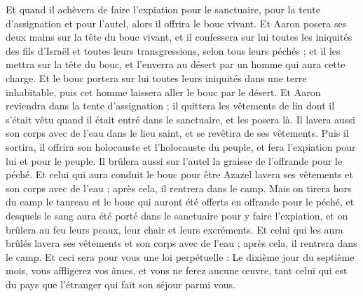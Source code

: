 \begin{multicols}{2}
Et quand il achèvera de faire l’expiation pour le sanctuaire, pour la tente d'assignation et pour l'autel, alors il offrira le bouc vivant.
Et Aaron posera ses deux mains sur la tête du bouc vivant, et il confessera sur lui toutes les iniquités des fils d'Israël et toutes leurs transgressions, selon tous leurs péchés ; et il les mettra sur la tête du bouc, et l'enverra au désert par un homme qui aura cette charge.
Et le bouc portera sur lui toutes leurs iniquités dans une terre inhabitable, puis cet homme laissera aller le bouc par le désert.
Et Aaron reviendra dans la tente d'assignation ; il quittera les vêtements de lin dont il s'était vêtu quand il était entré dans le sanctuaire, et les posera là.
Il lavera aussi son corps avec de l'eau dans le lieu saint, et se revêtira de ses vêtements. Puis il sortira, il offrira son holocauste et l'holocauste du peuple, et fera l’expiation pour lui et pour le peuple.
Il brûlera aussi sur l'autel la graisse de l'offrande pour le péché.
Et celui qui aura conduit le bouc pour être Azazel lavera ses vêtements et son corps avec de l'eau ; après cela, il rentrera dans le camp.
Mais on tirera hors du camp le taureau et le bouc qui auront été offerts en offrande pour le péché, et desquels le sang aura été porté dans le sanctuaire pour y faire l’expiation, et on brûlera au feu leurs peaux, leur chair et leurs excréments.
Et celui qui les aura brûlés lavera ses vêtements et son corps avec de l'eau ; après cela, il rentrera dans le camp.
Et ceci sera pour vous une loi perpétuelle : Le dixième jour du septième mois, vous affligerez vos âmes, et vous ne ferez aucune œuvre, tant celui qui est du pays que l'étranger qui fait son séjour parmi vous.

\end{multicols}
